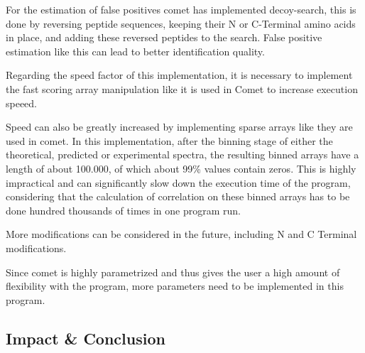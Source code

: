 \documentclass[11pt]{article}
\begin{document}
For the estimation of false positives comet has implemented decoy-search, this is done by reversing peptide sequences, keeping their N or C-Terminal amino acids in place, and adding these reversed peptides to the search. False positive estimation like this can lead to better identification quality.

Regarding the speed factor of this implementation, it is necessary to implement the fast scoring array manipulation like it is used in Comet to increase execution speeed.

Speed can also be greatly increased by implementing sparse arrays like they are used in comet. In this implementation, after the binning stage of either the theoretical, predicted or experimental spectra, the resulting binned arrays have a length of about 100.000, of which about 99\% values contain zeros. This is highly impractical and can significantly slow down the execution time of the program, considering that the calculation of correlation on these binned arrays has to be done hundred thousands of times in one program run.

More modifications can be considered in the future, including N and C Terminal modifications.

Since comet is highly parametrized and thus gives the user a high amount of flexibility with the program, more parameters need to be implemented in this program.

\subsection{Impact \& Conclusion}


\printbibliography
\end{document}
